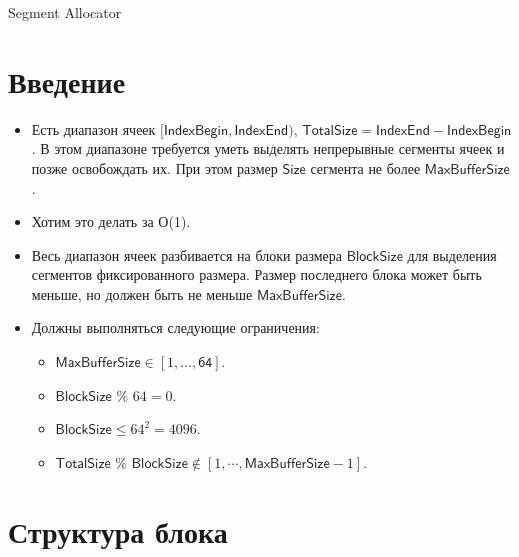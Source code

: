 \documentclass[12pt, a4paper]{article}
\begin{document}
	
	{\Huge Segment Allocator}
	
	\section{Введение}
	
	\begin{itemize}
		\item Есть диапазон ячеек $[ \textsf{IndexBegin}, \textsf{IndexEnd}) $, 
		$\textsf{TotalSize} = \textsf{IndexEnd} - \textsf{IndexBegin} $. 
		В этом диапазоне
		требуется уметь выделять непрерывные сегменты ячеек и позже освобождать их. При этом размер
		$\textsf{Size}$ сегмента не более $\textsf{MaxBufferSize}$.
		
		\item Хотим это делать за О(1).
		
		\item Весь диапазон ячеек разбивается на блоки размера $\textsf{BlockSize}$ для выделения сегментов
		фиксированного размера. Размер последнего блока может быть меньше, но должен быть не меньше 
		$\textsf{MaxBufferSize}$.
		
		\item Должны выполняться следующие ограничения:
			\begin{itemize}
				\item $\textsf{MaxBufferSize} \in \left[ 1,\ldots ,\textsf{64}\right] $.
				\item $\textsf{BlockSize}$ \% $64 = 0$.
				\item $\textsf{BlockSize} \leq 64^2 = 4096.$
				\item $\textsf{TotalSize}$ \% $\textsf{BlockSize} \notin [1,\cdots,\textsf{MaxBufferSize}-1]$.
		
			\end{itemize}
		
	\end{itemize}
	
	\section{Структура блока}
	
\end{document}
